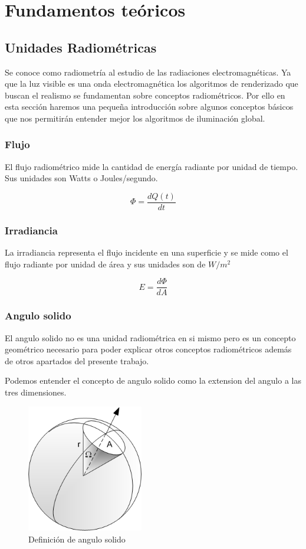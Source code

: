 \chapter{Fundamentos teóricos}

\section{Unidades Radiométricas}
Se conoce como radiometría al estudio de las radiaciones electromagnéticas. Ya que la luz visible es una onda electromagnética los algoritmos de renderizado que buscan el realismo se fundamentan sobre conceptos radiométricos. Por ello en esta sección haremos una pequeña introducción sobre algunos conceptos básicos que nos permitirán entender mejor los algoritmos de iluminación global.  
\subsection{Flujo}

El flujo radiométrico mide la cantidad de energía radiante por unidad de tiempo. Sus unidades son Watts o Joules/segundo.

\begin{equation}
\Phi = \frac{dQ(t)}{dt}
\end{equation}

\subsection{Irradiancia}
La irradiancia representa el flujo incidente en una superficie y se mide como el flujo radiante por unidad de área y sus unidades son de $W/m^2$ 

\begin{equation}
E = \frac{d\Phi}{dA}
\end{equation}

\clearpage

\subsection{Angulo solido}
El angulo solido no es una unidad radiométrica en si mismo pero es un concepto geométrico necesario para poder explicar otros conceptos radiométricos además de otros apartados del presente trabajo.

Podemos entender el concepto de angulo solido como la extension del angulo a las tres dimensiones.
\begin{figure}[h]
\centering
\includegraphics[width=2in]{Solid_Angle.png}
\caption{Definición de angulo solido \cite{Haade}}
\end{figure}

